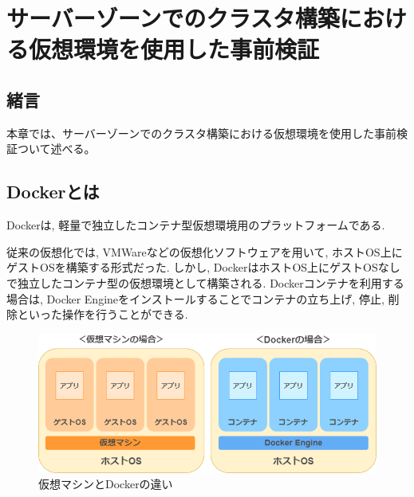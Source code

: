 \chapter{サーバーゾーンでのクラスタ構築における仮想環境を使用した事前検証}
\label{chap:fourth}

\section{緒言}
本章では、サーバーゾーンでのクラスタ構築における仮想環境を使用した事前検証ついて述べる。





\section{Dockerとは}
Dockerは, 軽量で独立したコンテナ型仮想環境用のプラットフォームである.

従来の仮想化では, VMWareなどの仮想化ソフトウェアを用いて, ホストOS上にゲストOSを構築する形式だった.
しかし, DockerはホストOS上にゲストOSなしで独立したコンテナ型の仮想環境として構築される.
Dockerコンテナを利用する場合は, Docker Engineをインストールすることでコンテナの立ち上げ, 停止, 削除といった操作を行うことができる.

\begin{figure}
  \begin{center}
    \includegraphics[width=120mm]{sotu/figure/docker-vmware.png}
    \caption{仮想マシンとDockerの違い \cite{3}}
    \label{4-p1}
  \end{center}
\end{figure}


